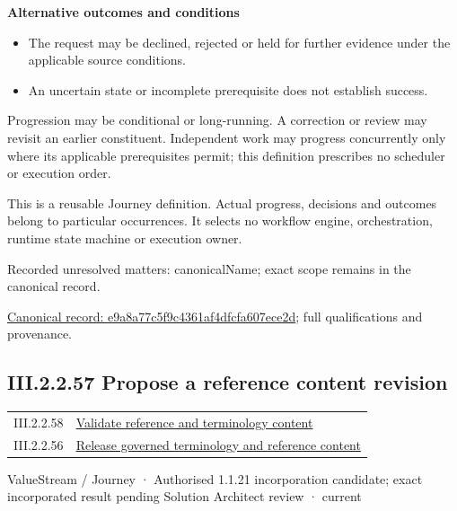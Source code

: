 \par\medskip\textbf{Alternative outcomes and conditions}\par


\begin{itemize}


\item The request may be declined, rejected or held for further evidence under the applicable source conditions.

\item An uncertain state or incomplete prerequisite does not establish success.

\end{itemize}


Progression may be conditional or long-running. A correction or review may revisit an earlier constituent. Independent work may progress concurrently only where its applicable prerequisites permit; this definition prescribes no scheduler or execution order.



This is a reusable Journey definition. Actual progress, decisions and outcomes belong to particular occurrences. It selects no workflow engine, orchestration, runtime state machine or execution owner.


{\small Recorded unresolved matters: canonicalName; exact scope remains in the canonical record.}\par
{\footnotesize \href{../../../../continuum/strategy/value-stream/e9a8a77c5f9c4361af4dfcfa607ece2d.md}{Canonical record: e9a8a77c5f9c4361af4dfcfa607ece2d}; full qualifications and provenance.}\par
\subsection*{III.2.2.57 Propose a reference content revision}
\label{navigation:III.2.2.57}

\begin{longtable}{p{.22\linewidth}p{.73\linewidth}}
III.2.2.58 & \hyperref[element:6e6c29788acd49ab87f918476d7a3de0]{Validate reference and terminology content} \\
III.2.2.56 & \hyperref[element:e9a8a77c5f9c4361af4dfcfa607ece2d]{Release governed terminology and reference content} \\
\end{longtable}
\label{element:60f86772914349b086fec14a06ebf30b}
{\small ValueStream / Journey · Authorised 1.1.21 incorporation candidate; exact incorporated result pending Solution Architect review · current}\par


